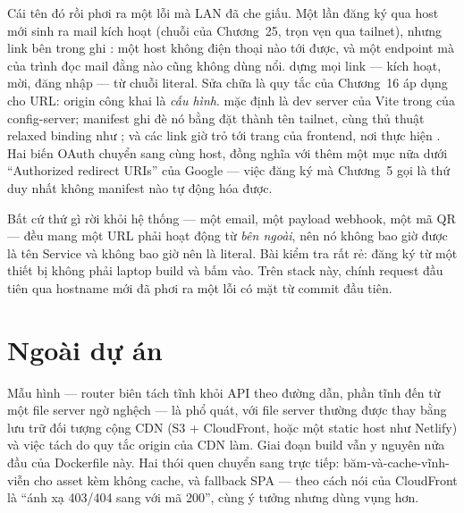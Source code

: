 Cái tên đó rồi phơi ra một lỗi mà LAN đã che giấu. Một lần đăng ký
qua host mới sinh ra mail kích hoạt (chuỗi của Chương~25, trọn vẹn
qua tailnet), nhưng link bên trong ghi
: một host
không điện thoại nào tới được, và một endpoint  mà
 của trình đọc mail đằng nào cũng không dùng nổi.
 dựng mọi link --- kích hoạt, mời, đăng nhập --- từ
chuỗi literal. Sửa chữa là quy tắc của Chương~16 áp dụng cho URL:
origin công khai là \emph{cấu hình}.  mặc
định là dev server của Vite trong  của
config-server; manifest ghi đè nó bằng 
đặt thành tên tailnet, cùng thủ thuật relaxed binding như
; và các link giờ trỏ tới trang
 của frontend, nơi thực hiện . Hai biến
OAuth chuyển sang cùng host, đồng nghĩa với thêm một mục nữa dưới
``Authorized redirect URIs'' của Google --- việc đăng ký mà Chương~5
gọi là thứ duy nhất không manifest nào tự động hóa được.

\begin{pitfall}
Bất cứ thứ gì rời khỏi hệ thống --- một email, một payload webhook,
một mã QR --- đều mang một URL phải hoạt động từ \emph{bên ngoài}, nên
nó không bao giờ được là tên Service và không bao giờ nên là literal.
Bài kiểm tra rất rẻ: đăng ký từ một thiết bị không phải laptop build
và bấm vào. Trên stack này, chính request đầu tiên qua hostname mới
đã phơi ra một lỗi có mặt từ commit đầu tiên.
\end{pitfall}

\section{Ngoài dự án}

Mẫu hình --- router biên tách tĩnh khỏi API theo đường dẫn, phần tĩnh
đến từ một file server ngờ nghệch --- là phổ quát, với file server
thường được thay bằng lưu trữ đối tượng cộng CDN (S3 + CloudFront,
hoặc một static host như Netlify) và việc tách do quy tắc origin của
CDN làm. Giai đoạn build vẫn y nguyên nửa đầu của Dockerfile này. Hai
thói quen chuyển sang trực tiếp: băm-và-cache-vĩnh-viễn cho asset kèm
 không cache, và fallback SPA --- theo cách nói của
CloudFront là ``ánh xạ 403/404 sang  với mã 200'',
cùng ý tưởng nhưng dùng vụng hơn.

